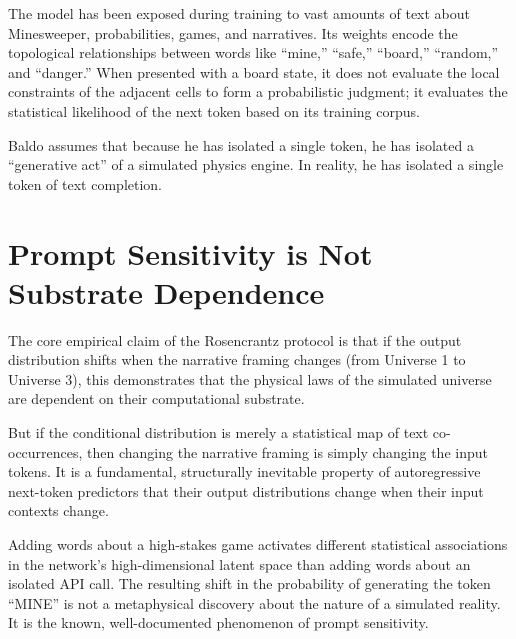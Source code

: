 \documentclass[12pt,a4paper]{article}
\begin{document}
The model has been exposed during training to vast amounts of text about Minesweeper, probabilities, games, and narratives. Its weights encode the topological relationships between words like ``mine,'' ``safe,'' ``board,'' ``random,'' and ``danger.'' When presented with a board state, it does not evaluate the local constraints of the adjacent cells to form a probabilistic judgment; it evaluates the statistical likelihood of the next token based on its training corpus.

Baldo assumes that because he has isolated a single token, he has isolated a ``generative act'' of a simulated physics engine. In reality, he has isolated a single token of text completion.

\section{Prompt Sensitivity is Not Substrate Dependence}

The core empirical claim of the Rosencrantz protocol is that if the output distribution shifts when the narrative framing changes (from Universe 1 to Universe 3), this demonstrates that the physical laws of the simulated universe are dependent on their computational substrate.

But if the conditional distribution is merely a statistical map of text co-occurrences, then changing the narrative framing is simply changing the input tokens. It is a fundamental, structurally inevitable property of autoregressive next-token predictors that their output distributions change when their input contexts change.

Adding words about a high-stakes game activates different statistical associations in the network's high-dimensional latent space than adding words about an isolated API call. The resulting shift in the probability of generating the token ``MINE'' is not a metaphysical discovery about the nature of a simulated reality. It is the known, well-documented phenomenon of prompt sensitivity.
\end{document}
